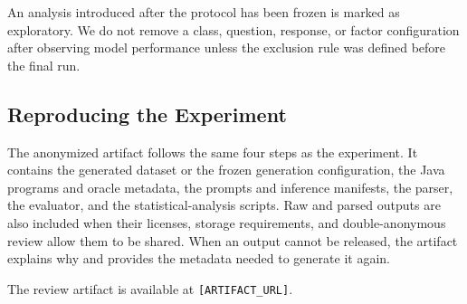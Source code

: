 An analysis introduced after the protocol has been frozen is marked as exploratory. We do not remove a class, question, response, or factor configuration after observing model performance unless the exclusion rule was defined before the final run.

\subsection{Reproducing the Experiment}
\label{subsec:artifact-support}

The anonymized artifact follows the same four steps as the experiment. It contains the generated dataset or the frozen generation configuration, the Java programs and oracle metadata, the prompts and inference manifests, the parser, the evaluator, and the statistical-analysis scripts. Raw and parsed outputs are also included when their licenses, storage requirements, and double-anonymous review allow them to be shared. When an output cannot be released, the artifact explains why and provides the metadata needed to generate it again.

The review artifact is available at \texttt{[ARTIFACT\_URL]}.
